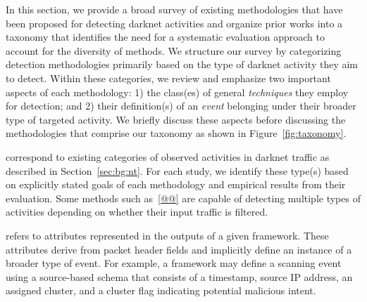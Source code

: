 \documentclass[manuscript,nonacm]{acmart}
\begin{document}
In this section, we provide a broad survey of existing methodologies that have been proposed for detecting darknet activities and 
organize prior works into a taxonomy that identifies the need for a systematic evaluation approach to account for the diversity of methods.
We structure our survey by categorizing detection methodologies primarily based on the type of darknet activity they aim to detect. 
Within these categories, we review and emphasize two important aspects of each methodology: 
1) the class(es) of general \textit{techniques} they employ for detection; and 
2) their definition(s) of an \textit{event} belonging under their broader type of targeted activity.
We briefly discuss these aspects before discussing the methodologies that comprise our taxonomy as shown in Figure~\ref{fig:taxonomy}.


\vspace{0.25em}
 correspond to existing categories of observed activities in darknet traffic as described in Section~\ref{sec:bg:nt}. 
For each study, we identify these type(s) based on explicitly stated goals of each methodology and empirical results from their evaluation. 
Some methods such as~\ref{@@} are capable of detecting multiple types of activities depending on whether their input traffic is filtered.


\vspace{0.25em}
 refers to attributes represented in the outputs of a given framework.
These attributes derive from packet header fields and implicitly define an instance of a broader type of event.
For example, a framework may define a scanning event using a source-based schema that consists of a timestamp, source IP address, an assigned cluster, and a cluster flag indicating potential malicious intent.
\end{document}
